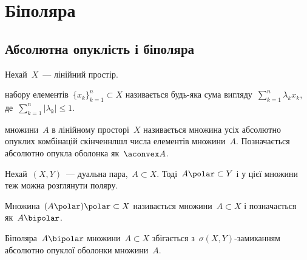 \chapter{Біполяра}

\section{Абсолютна опуклість і біполяра}

\begin{definition}
    Нехай~$X$~--- лінійний простір.
    
     набору елементів~$\{x_k\}_{k = 1}^n \subset X$ називається будь-яка сума вигляду~$\sum_{k = 1}^n \lambda_k x_k$, де~$\sum_{k = 1}^n |\lambda_k| \le 1$.
\end{definition}

\begin{definition}
     множини~$A$ в лінійному просторі~$X$ називається множина усіх абсолютно опуклих комбінацій скінченнлшл числа елементів множини~$A$. Позначається абсолютно опукла оболонка як~$\aconvex A$.
\end{definition}

Нехай~$(X, Y)$~--- дуальна пара,~$A \subset X$. Тоді~$A\polar \subset Y$ і у цієї множини теж можна розглянути поляру.

\begin{definition}
    Множина~$(A\polar)\polar \subset X$ називається  множини~$A \subset X$ і позначається як~$A\bipolar$.
\end{definition}

\begin{theorem}
    Біполяра~$A\bipolar$ множини~$A \subset X$ збігається з~$\sigma(X, Y)$-замиканням абсолютно опуклої оболонки множини~$A$.
\end{theorem}

